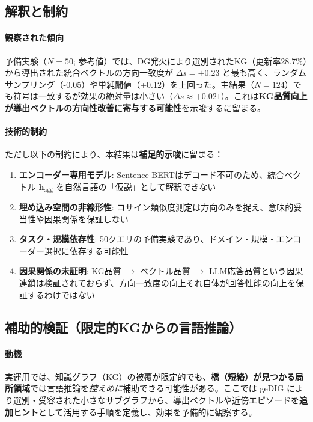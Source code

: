 \documentclass[ja=standard,xelatex]{bxjsarticle}
\begin{document}

\subsection{解釈と制約}

\paragraph{観察された傾向}
予備実験（$N{=}50$; 参考値）では、DG発火により選別されたKG（更新率28.7\%）から導出された統合ベクトルの方向一致度が $\Delta s = +0.23$ と最も高く、ランダムサンプリング（-0.05）や単純閾値（+0.12）を上回った。主結果（$N{=}124$）でも符号は一致するが効果の絶対量は小さい（$\Delta s\approx+0.021$）。これは\textbf{KG品質向上が導出ベクトルの方向性改善に寄与する可能性}を示唆するに留まる。

\paragraph{技術的制約}
ただし以下の制約により、本結果は\textbf{補足的示唆}に留まる：

\begin{enumerate}
  \item \textbf{エンコーダー専用モデル}: Sentence-BERTはデコード不可のため、統合ベクトル $\mathbf{h}_{\text{agg}}$ を自然言語の「仮説」として解釈できない

  \item \textbf{埋め込み空間の非線形性}: コサイン類似度測定は方向のみを捉え、意味的妥当性や因果関係を保証しない
  \item \textbf{タスク・規模依存性}: 50クエリの予備実験であり、ドメイン・規模・エンコーダー選択に依存する可能性
  \item \textbf{因果関係の未証明}: KG品質 $\to$ ベクトル品質 $\to$ LLM応答品質という因果連鎖は検証されておらず、方向一致度の向上それ自体が回答性能の向上を保証するわけではない
\end{enumerate}

\subsection{補助的検証（限定的KGからの言語推論）}
\label{sec:rag_limited_reasoning}
\paragraph{動機}
実運用では、知識グラフ（KG）の被覆が限定的でも、\textbf{橋（短絡）が見つかる局所領域}では言語推論を\emph{控えめに}補助できる可能性がある。ここでは geDIG により選別・受容された小さなサブグラフから、導出ベクトルや近傍エピソードを\textbf{追加ヒント}として活用する手順を定義し、効果を予備的に観察する。
\end{document}

